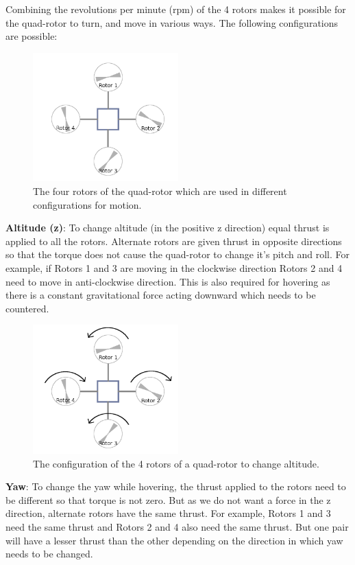\documentclass[hidelinks,BTech]{iitmdiss}
\begin{document}
Combining the revolutions per minute (rpm) of the 4 rotors makes it possible for the quad-rotor to turn, and move in various ways. The following configurations are possible:

\begin{figure}[H]
  \centering
    \includegraphics[width=0.5\textwidth]{quadrotor_rotors_names.png}
    \caption{The four rotors of the quad-rotor which are used in different configurations for motion.}
\end{figure}

{\bf Altitude (z)}: To change altitude (in the positive z direction) equal thrust is applied to all the rotors. Alternate rotors are given thrust in opposite directions so that the torque does not cause the quad-rotor to change it's pitch and roll. For example, if Rotors 1 and 3 are moving in the clockwise direction Rotors 2 and 4 need to move in anti-clockwise direction. This is also required for hovering as there is a constant gravitational force acting downward which needs to be countered.

\begin{figure}[H]
  \centering
    \includegraphics[width=0.5\textwidth]{quadrotor_rotors_altitude.png}
    \caption{The configuration of the 4 rotors of a quad-rotor to change altitude.}
\end{figure}

{\bf Yaw}: To change the yaw while hovering, the thrust applied to the rotors need to be different so that torque is not zero. But as we do not want a force in the z direction, alternate rotors have the same thrust. For example, Rotors 1 and 3 need the same thrust and Rotors 2 and 4 also need the same thrust. But one pair will have a lesser thrust than the other depending on the direction in which yaw needs to be changed.
\end{document}
